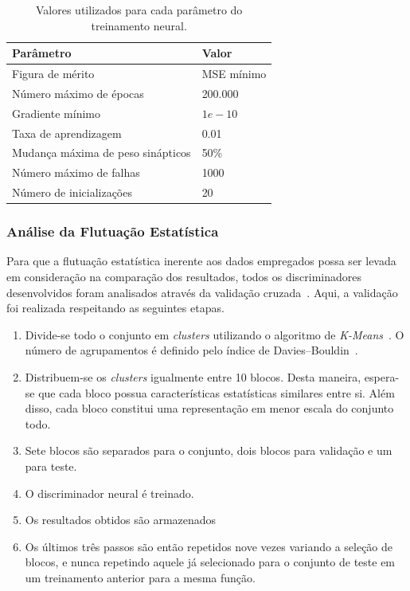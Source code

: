 \begin{table}[htbp!]\footnotesize
  \centering
  \tabcolsep=0.08cm
  \begin{tabular}{ m{7cm} m{3cm} }
      Parâmetro & Valor \\
      \midrule
      Figura de mérito           & MSE mínimo \\
      Número máximo de épocas    & 200.000 \\
      Gradiente mínimo           & $1e-10$ \\
      Taxa de aprendizagem       & 0.01 \\
      Mudança máxima de peso sinápticos    & 50\% \\
      Número máximo de falhas    & 1000 \\
      Número de inicializações   & 20 \\
      \bottomrule
  \end{tabular}
  \caption{Valores utilizados para cada parâmetro do treinamento neural.}
  \label{table:nnparameters}

\end{table}

\subsubsection{Análise da Flutuação Estatística}

Para que a flutuação estatística inerente aos dados empregados possa ser levada
em consideração na comparação dos resultados, todos os discriminadores
desenvolvidos foram analisados através da validação cruzada~\cite{HAYKIN2008}.
Aqui, a validação foi realizada respeitando as seguintes etapas.

\begin{enumerate}
    \item Divide-se todo o conjunto em \emph{clusters} utilizando o algoritmo de
    \emph{K-Means}~\cite{HARTIGAN1979}. O número de agrupamentos é definido pelo
    índice de Davies--Bouldin~\cite{DAVIES1979}.
    \item Distribuem-se os \emph{clusters} igualmente entre 10 blocos. Desta
    maneira, espera-se que cada bloco possua características estatísticas
    similares entre si. Além disso, cada bloco constitui uma representação em
    menor escala do conjunto todo.
    \item Sete blocos são separados para o conjunto, dois blocos para validação
    e um para teste.
    \item O discriminador neural é treinado.
    \item Os resultados obtidos são armazenados
    \item Os últimos três passos são então repetidos nove vezes variando a
    seleção de blocos, e nunca repetindo aquele já selecionado para o conjunto
    de teste em um treinamento anterior para a mesma função.
\end{enumerate}


